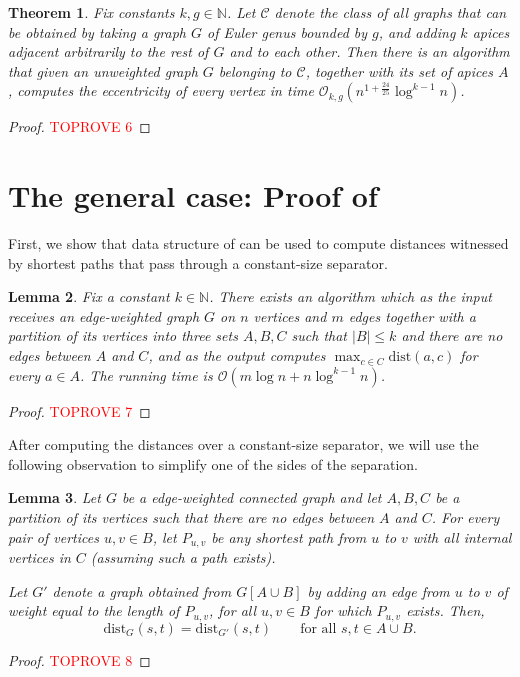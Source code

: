 \documentclass[11pt,a4paper]{article}
\newtheorem{lemma}{Lemma}[section]
\newtheorem{theorem}[lemma]{Theorem}
\newcommand{\Oh}{\mathcal{O}}
\newcommand{\dist}{\mathrm{dist}}
\renewcommand{\leq}{\leqslant}
\begin{document}
\begin{theorem}\label{t:main_bdgenus_apices}
Fix constants $k, g \in \mathbb{N}$. Let $\mathcal{C}$ denote the class of all graphs that can be obtained by taking a graph $G$ of Euler genus bounded by $g$, and adding $k$ apices adjacent arbitrarily to the rest of $G$ and to each other. Then there is an algorithm that given an unweighted graph $G$ belonging to $\mathcal{C}$, together with its set of apices $A$, computes the eccentricity of every vertex in time $\Oh_{k,g} \left( n^{1 + \frac{24}{25}} \log^{k - 1} n \right)$.
\end{theorem}

\begin{proof}\textcolor{red}{TOPROVE 6}\end{proof}
 
\section{The general case: Proof of \texorpdfstring{}{Theorem 1.6}}\label{sec:algo}

First, we show that data structure of  can be used to compute distances witnessed by shortest paths that pass through a constant-size separator.

\begin{lemma}\label{l:single_adhesion}
Fix a constant $k \in \mathbb{N}$. There exists an algorithm which as the input receives an edge-weighted graph $G$ on $n$ vertices and $m$ edges together with a partition of its vertices into three sets $A, B, C$ such that $|B| \leq k$ and there are no edges between $A$ and $C$, and as the output computes $\max_{c \in C} \dist(a, c)$ for every $a \in A$. The running time is $\Oh(m \log n + n \log^{k - 1} n)$.
\end{lemma}

\begin{proof}\textcolor{red}{TOPROVE 7}\end{proof}

After computing the distances over a constant-size separator, we will use the following observation to simplify one of the sides of the separation.

\begin{lemma}\label{l:inserting_paths}
Let $G$ be a edge-weighted connected graph and let $A, B, C$ be a partition of its vertices such that there are no edges between $A$ and $C$. For every pair of vertices $u, v \in B$, let $P_{u, v}$ be any shortest path from $u$ to $v$ with all internal vertices in $C$ (assuming such a path exists).

Let $G'$ denote a graph obtained from $G[A \cup B]$ by adding an edge from $u$ to $v$ of weight equal to the length of $P_{u, v}$, for all $u, v \in B$ for which $P_{u, v}$ exists. Then,  $$\dist_G(s, t) = \dist_{G'}(s, t)\qquad\textrm{for all }s,t\in A\cup B.$$
\end{lemma}
\begin{proof}\textcolor{red}{TOPROVE 8}\end{proof}
\end{document}
